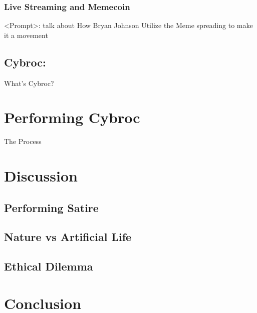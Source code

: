 \documentclass[manuscript,review]{acmart}
\begin{document}
\subsubsection{Live Streaming and Memecoin}
<Prompt>: talk about How Bryan Johnson Utilize the Meme spreading to make it a movement 



\subsection{Cybroc: }
What's Cybroc?

\section{Performing Cybroc}
The Process 

\section{Discussion}

\subsection{Performing Satire}
\subsection{Nature vs Artificial Life}
\subsection{Ethical Dilemma}


\section{Conclusion}











\appendix
%
\end{document}
